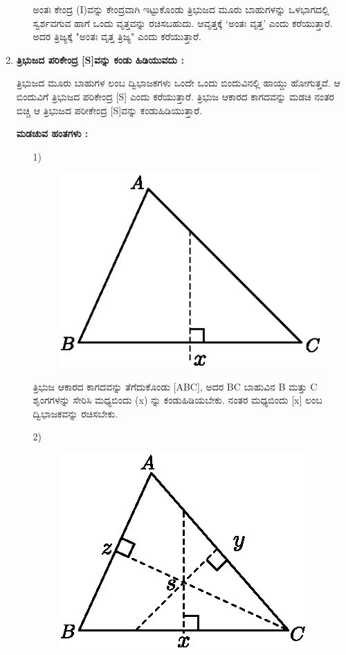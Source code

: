 \begin{enumerate}
\begin{itemize}
 ಅಂತಃ ಕೇಂದ್ರ (I)ವನ್ನು ಕೇಂದ್ರವಾಗಿ ಇಟ್ಟುಕೊಂಡು ತ್ರಿಭುಜದ ಮೂರು ಬಾಹುಗಳನ್ನು ಒಳಭಾಗದಲ್ಲಿ ಸ್ವರ್ಶವಗುವ ಹಾಗೆ ಒಂದು ವೃತ್ತವನ್ನು ರಚಿಸಬಹುದು. ಆವೃತ್ತಕ್ಕೆ  `ಅಂತಃ ವೃತ್ತ' ಎಂದು ಕರೆಯುತ್ತಾರೆ. ಅದರ ತ್ರಿಜ್ಯಕ್ಕೆ "ಅಂತಃ ವೃತ್ತ ತ್ರಿಜ್ಯ" ಎಂದು ಕರೆಯುತ್ತಾರೆ. 
  \end{itemize}
  
  \item \textbf{ತ್ರಿಭುಜದ ಪರಿಕೇಂದ್ರ [S]ವನ್ನು ಕಂಡು ಹಿಡಿಯುವದು :}
  
  ತ್ರಿಭುಜದ ಮೂರು ಬಾಹುಗಳ ಲಂಬ ದ್ವಿಭಾಜಕಗಳು ಒಂದೇ ಒಂದು ಬಿಂದುವಿನಲ್ಲಿ ಹಾಯ್ದು ಹೋಗುತ್ತವೆ. ಆ ಬಿಂದುವಿಗೆ ತ್ರಿಭುಜದ ಪರಿಕೇಂದ್ರ [S] ಎಂದು ಕರೆಯುತ್ತಾರೆ. ತ್ರಿಭುಜ ಆಕಾರದ ಕಾಗದವನ್ನು ಮಡಚಿ ನಂತರ ಬಿಚ್ಚಿ ಆ ತ್ರಿಭುಜದ ಪರೀಕೇಂದ್ರ [S]ವನ್ನು ಕಂಡುಹಿಡಿಯುತ್ತಾರೆ. 
  
\medskip
    \noindent
 \textbf{ಮಡಚುವ ಹಂತಗಳು :}
  \begin{itemize}
 \item[1)] 
 ~
 \begin{figure}[H]
\centering
\includegraphics[scale=.9]{src/figure/chap1/fig1-38a.eps}
\end{figure}
  
 
 ತ್ರಿಭುಜ ಆಕಾರದ ಕಾಗದವನ್ನು ತೆಗೆದುಕೊಂಡು [ABC], ಅದರ  BC ಬಾಹುವಿನ  B ಮತ್ತು C ಶೃಂಗಗಳನ್ನು ಸೇರಿಸಿ ಮಧ್ಯಬಿಂದು  (x) ನ್ನು ಕಂಡುಹಿಡಿಯಬೇಕು. ನಂತರ ಮಧ್ಯಬಿಂದು  [x] ಲಂಬ ದ್ವಿಭಾಜಕವನ್ನು ರಚಿಸಬೇಕು.
 
 
 \item[2)] 
 ~
 \begin{figure}[H]
\centering
\includegraphics[scale=.9]{src/figure/chap1/fig1-38b.eps}
\end{figure}
 

\end{itemize}
\end{enumerate}
